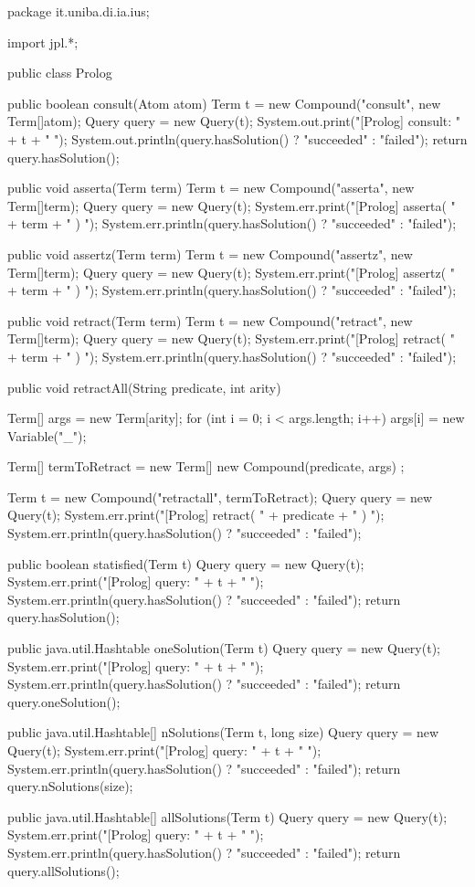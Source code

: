   \begin{javacode}
  package it.uniba.di.ia.ius;
  
  import jpl.*;
  
  public class Prolog {
  	
  	public boolean consult(Atom atom) {
  		Term t = new Compound("consult", new Term[]{atom});
  		Query query = new Query(t);
  		System.out.print("[Prolog] consult: " + t + " ");
  		System.out.println(query.hasSolution() ? "succeeded" : "failed");
  		return query.hasSolution();
  	}
  	
  	public void asserta(Term term) {
  		Term t = new Compound("asserta", new Term[]{term});
  		Query query = new Query(t);
  		System.err.print("[Prolog] asserta( " + term + " ) ");
  		System.err.println(query.hasSolution() ? "succeeded" : "failed");
  	}
  	
  	public void assertz(Term term) {
  		Term t = new Compound("assertz", new Term[]{term});
  		Query query = new Query(t);
  		System.err.print("[Prolog] assertz( " + term + " ) ");
  		System.err.println(query.hasSolution() ? "succeeded" : "failed");
  	}
  	
  	public void retract(Term term) {
  		Term t = new Compound("retract", new Term[]{term});
  		Query query = new Query(t);
  		System.err.print("[Prolog] retract( " + term + " ) ");
  		System.err.println(query.hasSolution() ? "succeeded" : "failed");
  	}
  	
  	public void retractAll(String predicate, int arity) {
  		
  		Term[] args = new Term[arity];
  		for (int i = 0; i < args.length; i++)
  		args[i] = new Variable("_");
  		
  		Term[] termToRetract = new Term[]{ new Compound(predicate, args) };
  		
  		Term t = new Compound("retractall", termToRetract);
  		Query query = new Query(t);
  		System.err.print("[Prolog] retract( " + predicate + " ) ");
  		System.err.println(query.hasSolution() ? "succeeded" : "failed");
  	}
  	
  	public boolean statisfied(Term t) {
  		Query query = new Query(t);
  		System.err.print("[Prolog] query: " + t + " ");
  		System.err.println(query.hasSolution() ? "succeeded" : "failed");
  		return query.hasSolution();
  	}
  	
  	public java.util.Hashtable oneSolution(Term t) {
  		Query query = new Query(t);
  		System.err.print("[Prolog] query: " + t + " ");
  		System.err.println(query.hasSolution() ? "succeeded" : "failed");
  		return query.oneSolution();
  	}
  	
  	public java.util.Hashtable[] nSolutions(Term t, long size) {
  		Query query = new Query(t);
  		System.err.print("[Prolog] query: " + t + " ");
  		System.err.println(query.hasSolution() ? "succeeded" : "failed");
  		return query.nSolutions(size);
  	}
  	
  	public java.util.Hashtable[] allSolutions(Term t) {
  		Query query = new Query(t);
  		System.err.print("[Prolog] query: " + t + " ");
  		System.err.println(query.hasSolution() ? "succeeded" : "failed");
  		return query.allSolutions();
  	}
  }
    \end{javacode}
  

